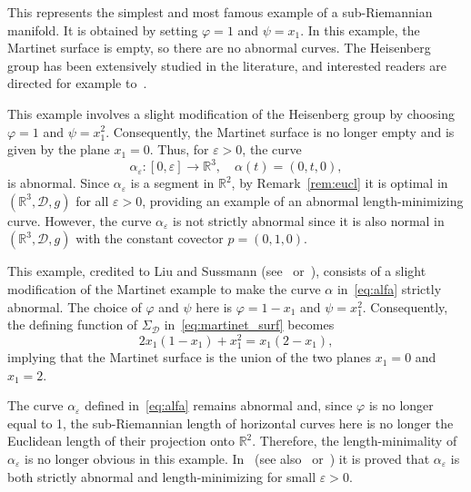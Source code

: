 \documentclass[12pt]{amsart}
\theoremstyle{plain}
\theoremstyle{definition}
\theoremstyle{remark}
\numberwithin{equation}{section}
\newcommand{\R}{\mathbb{R}}
\newcommand{\D}{\mathcal{D}}
\newcommand{\<}{\langle}
\renewcommand{\>}{\rangle}
\newcommand{\e}{\varepsilon}
\newcommand{\0}{\theta}
\renewcommand{\a}{\alpha}
\newcommand{\1}{{-1}}
\renewcommand{\=}{\coloneqq}
\renewcommand{\.}{\dots}
\renewcommand{\-}{\cdot}
\renewcommand{\:}{\,:\,}
\theoremstyle{definition}
\begin{document}
\medskip

 This represents the simplest and most famous example of a sub-Riemannian manifold. It is obtained by setting $\varphi=1$ and $\psi=x_1$. In this example, the Martinet surface is empty, so there are no abnormal curves. The Heisenberg group has been extensively studied in the literature, and interested readers are directed for example to~\cite{Mon02}.



\medskip

 This example involves a slight modification of the Heisenberg group by choosing $\varphi=1$ and $\psi=x_1^2$. Consequently, the Martinet surface is no longer empty and is given by the plane $x_1=0$. Thus, for $\e>0$, the curve
\begin{equation}
	\label{eq:alfa}
	\a_\e:[0,\e]\to\R^3, \quad \a(t)=(0,t,0),
\end{equation}
is abnormal. Since $\a_\e$ is a segment in $\R^2$, by Remark~\ref{rem:eucl} it is optimal in $(\R^3,\D,g)$ for all $\e>0$, providing an example of an abnormal length-minimizing curve. However, the curve $\a_\e$ is not strictly abnormal since it is also normal in $(\R^3,\D,g)$ with the constant covector $p=(0,1,0)$.



\medskip

 This example, credited to Liu and Sussmann (see~\cite{LS95} or~\cite[Chapter 3]{Mon02}), consists of a slight modification of the Martinet example to make the curve $\alpha$ in~\eqref{eq:alfa} strictly abnormal. The choice of $\varphi$ and $\psi$ here is $\varphi=1-x_1$ and $\psi=x_1^2$. Consequently, the defining function of $\Sigma_{\mathcal{D}}$ in~\eqref{eq:martinet_surf} becomes
\begin{equation}
	2x_1(1-x_1)+x_1^2=x_1(2-x_1),
\end{equation}
implying that the Martinet surface is the union of the two planes $x_1=0$ and $x_1=2$.

The curve $\a_\e$ defined in~\eqref{eq:alfa} remains abnormal and, since $\varphi$ is no longer equal to 1, the sub-Riemannian length of horizontal curves here is no longer the Euclidean length of their projection onto $\R^2$. Therefore, the length-minimality of $\a_\e$ is no longer obvious in this example. In~\cite{LS95} (see also~\cite[Chapter 3]{Mon02} or~\cite[Section 2.5]{Rif14}) it is proved that $\a_\e$ is both strictly abnormal and length-minimizing for small $\e>0$. 
\end{document}
